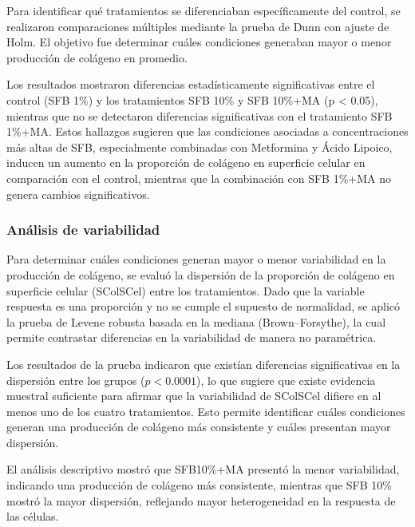 \documentclass[
  10pt,
]{article}
\begin{document}
Para identificar qué tratamientos se diferenciaban específicamente del
control, se realizaron comparaciones múltiples mediante la prueba de
Dunn con ajuste de Holm. El objetivo fue determinar cuáles condiciones
generaban mayor o menor producción de colágeno en promedio.

Los resultados mostraron diferencias estadísticamente significativas
entre el control (SFB 1\%) y los tratamientos SFB 10\% y SFB 10\%+MA (p
\textless{} 0.05), mientras que no se detectaron diferencias
significativas con el tratamiento SFB 1\%+MA. Estos hallazgos sugieren
que las condiciones asociadas a concentraciones más altas de SFB,
especialmente combinadas con Metformina y Ácido Lipoico, inducen un
aumento en la proporción de colágeno en superficie celular en
comparación con el control, mientras que la combinación con SFB 1\%+MA
no genera cambios significativos.

\subsubsection{Análisis de
variabilidad}\label{anuxe1lisis-de-variabilidad}

Para determinar cuáles condiciones generan mayor o menor variabilidad en
la producción de colágeno, se evaluó la dispersión de la proporción de
colágeno en superficie celular (SColSCel) entre los tratamientos. Dado
que la variable respuesta es una proporción y no se cumple el supuesto
de normalidad, se aplicó la prueba de Levene robusta basada en la
mediana (Brown--Forsythe), la cual permite contrastar diferencias en la
variabilidad de manera no paramétrica.

Los resultados de la prueba indicaron que existían diferencias
significativas en la dispersión entre los grupos (\(p < 0.0001\)), lo
que sugiere que existe evidencia muestral suficiente para afirmar que la
variabilidad de SColSCel difiere en al menos uno de los cuatro
tratamientos. Esto permite identificar cuáles condiciones generan una
producción de colágeno más consistente y cuáles presentan mayor
dispersión.

El análisis descriptivo mostró que SFB10\%+MA presentó la menor
variabilidad, indicando una producción de colágeno más consistente,
mientras que SFB 10\% mostró la mayor dispersión, reflejando mayor
heterogeneidad en la respuesta de las células.
\end{document}
